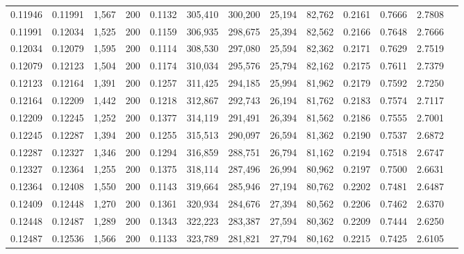 \begin{tabular}{rrrrrrrrrrrrr}
0.11946 & 0.11991 & 1,567 & 200 &                                     0.1132 & 305,410 & 300,200 &  25,194 &  82,762 & 0.2161 & 0.7666 & 2.7808 \\
0.11991 & 0.12034 & 1,525 & 200 &                                     0.1159 & 306,935 & 298,675 &  25,394 &  82,562 & 0.2166 & 0.7648 & 2.7666 \\
0.12034 & 0.12079 & 1,595 & 200 &                                     0.1114 & 308,530 & 297,080 &  25,594 &  82,362 & 0.2171 & 0.7629 & 2.7519 \\
0.12079 & 0.12123 & 1,504 & 200 &                                     0.1174 & 310,034 & 295,576 &  25,794 &  82,162 & 0.2175 & 0.7611 & 2.7379 \\
0.12123 & 0.12164 & 1,391 & 200 &                                     0.1257 & 311,425 & 294,185 &  25,994 &  81,962 & 0.2179 & 0.7592 & 2.7250 \\
0.12164 & 0.12209 & 1,442 & 200 &                                     0.1218 & 312,867 & 292,743 &  26,194 &  81,762 & 0.2183 & 0.7574 & 2.7117 \\
0.12209 & 0.12245 & 1,252 & 200 &                                     0.1377 & 314,119 & 291,491 &  26,394 &  81,562 & 0.2186 & 0.7555 & 2.7001 \\
0.12245 & 0.12287 & 1,394 & 200 &                                     0.1255 & 315,513 & 290,097 &  26,594 &  81,362 & 0.2190 & 0.7537 & 2.6872 \\
0.12287 & 0.12327 & 1,346 & 200 &                                     0.1294 & 316,859 & 288,751 &  26,794 &  81,162 & 0.2194 & 0.7518 & 2.6747 \\
0.12327 & 0.12364 & 1,255 & 200 &                                     0.1375 & 318,114 & 287,496 &  26,994 &  80,962 & 0.2197 & 0.7500 & 2.6631 \\
0.12364 & 0.12408 & 1,550 & 200 &                                     0.1143 & 319,664 & 285,946 &  27,194 &  80,762 & 0.2202 & 0.7481 & 2.6487 \\
0.12409 & 0.12448 & 1,270 & 200 &                                     0.1361 & 320,934 & 284,676 &  27,394 &  80,562 & 0.2206 & 0.7462 & 2.6370 \\
0.12448 & 0.12487 & 1,289 & 200 &                                     0.1343 & 322,223 & 283,387 &  27,594 &  80,362 & 0.2209 & 0.7444 & 2.6250 \\
0.12487 & 0.12536 & 1,566 & 200 &                                     0.1133 & 323,789 & 281,821 &  27,794 &  80,162 & 0.2215 & 0.7425 & 2.6105 \\

\end{tabular}
